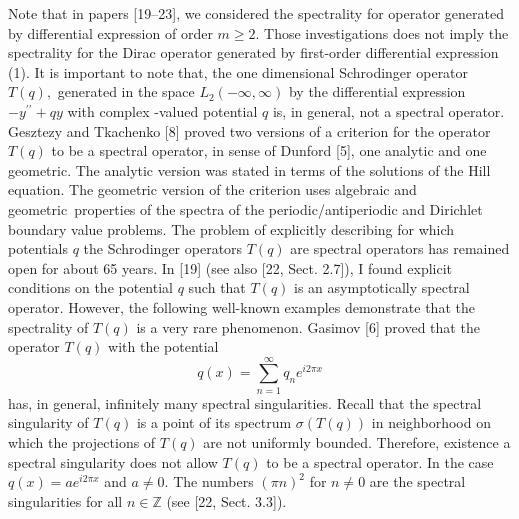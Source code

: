 \documentclass{article}%
\begin{document}
Note that in papers [19--23], we considered the spectrality for operator
generated by differential expression of order $m\geq2.$ Those investigations
does not imply the spectrality for the Dirac operator generated by first-order
differential expression (1). It is important to note that, the one dimensional
Schrodinger operator $T(q),$ generated in the space $L_{2}(-\infty,\infty)$ by
the differential expression $-y^{\prime\prime}+qy$ with complex -valued
potential $q$ is, in general, not a spectral operator. Gesztezy and Tkachenko
[8] proved two versions of a criterion for the operator $T(q)$ to be a
spectral operator, in sense of Dunford [5], one analytic and one geometric.
The analytic version was stated in terms of the solutions of the Hill
equation. The geometric version of the criterion uses algebraic and
geometric\ properties of the spectra of the periodic/antiperiodic and
Dirichlet boundary value problems. The problem of explicitly describing for
which potentials $q$ the Schrodinger operators $T(q)$ are spectral operators
has remained open for about 65 years. In [19] (see also [22, Sect. 2.7]), I
found explicit conditions on the potential $q$ such that $T(q)$ is an
asymptotically spectral operator. However, the following well-known examples
demonstrate that the spectrality of $T(q)$ is a very rare phenomenon. Gasimov
[6] proved that the operator $T(q)$ with the potential
\[
q(x)=%
{\textstyle\sum\limits_{n=1}^{\infty}}
q_{n}e^{i2\pi x}%
\]
has, in general, infinitely many spectral singularities. Recall that the
spectral singularity of $T(q)$ is a point of its spectrum $\sigma(T(q))$ in
neighborhood on which the projections of $T(q)$ are not uniformly bounded.
Therefore, existence a spectral singularity does not allow $T(q)$ to be a
spectral operator. In the case $q(x)=ae^{i2\pi x}$ and $a\neq0.$ The numbers
$\left(  \pi n\right)  ^{2}$ for $n\neq0$ are the spectral singularities for
all $n\in\mathbb{Z}$ (see [22, Sect. 3.3]).
\end{document}
